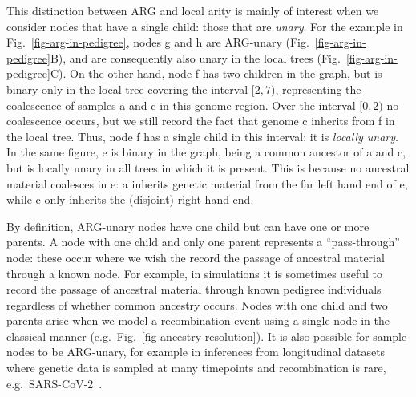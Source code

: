 \documentclass[9pt,twocolumn,twoside]{gsajnl}
\newcommand{\noderef}[1]{\textsf{#1}}
\begin{document}
This distinction between ARG and local arity is mainly
of interest when we consider nodes that have
a single child: those that are \emph{unary}.
For the example in Fig.~\ref{fig-arg-in-pedigree}, nodes
\noderef{g} and \noderef{h}
are ARG-unary (Fig.~\ref{fig-arg-in-pedigree}B), and are consequently
also unary in the local trees (Fig.~\ref{fig-arg-in-pedigree}C).
On the other hand, node \noderef{f} has two children
in the graph, but is binary only
in the local tree covering the interval $[2, 7)$,
representing the coalescence of samples \noderef{a} and \noderef{c}
in this genome region. Over the interval $[0, 2)$ no coalescence occurs,
but we still record the fact that genome \noderef{c} inherits from \noderef{f}
in the local tree. Thus, node \noderef{f} has a single child in this
interval: it is \emph{locally unary}.
In the same figure, \noderef{e} is binary in the graph, being a common
ancestor of \noderef{a} and \noderef{c}, but is
locally unary in all trees in which it is present.
This is because no ancestral material coalesces in \noderef{e}:
\noderef{a} inherits genetic material from the far left hand end of
\noderef{e},
while \noderef{c} only inherits the (disjoint) right hand end.

By definition, ARG-unary nodes have one child but can have one or
more parents.
A node with one child and only one parent represents a ``pass-through'' node:
these occur where we wish the record the passage of ancestral material
through a known node. For example, in simulations
it is sometimes useful to record the passage of
ancestral material through known pedigree individuals
regardless of whether common ancestry occurs.
Nodes with one child and two parents arise when
we model a recombination event using a single node
in the classical manner
(e.g.\ Fig.~\ref{fig-ancestry-resolution}).
It is also possible for sample nodes to be ARG-unary, for example
in inferences from longitudinal datasets where genetic
data is sampled at many timepoints and recombination
is rare, e.g.~SARS-CoV-2~\citep{zhan2023towards}.
\end{document}
